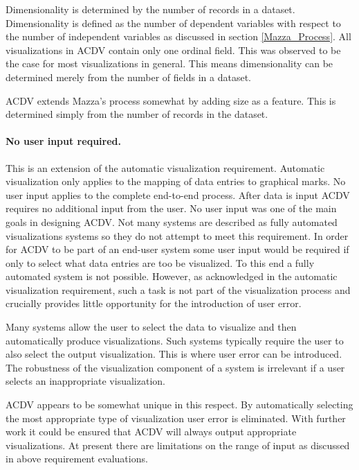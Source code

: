 \documentclass[a4paper, 11pt, titlepage, onehalfspacing]{report}
\begin{document}
Dimensionality is determined by the number of records in a dataset. Dimensionality is defined as the number of dependent variables with respect to the number of independent variables as discussed in section \ref{Mazza_Process}. All visualizations in AC\lightning{}DV contain only one ordinal field. This was observed to be the case for most visualizations in general. This means dimensionality can be determined merely from the number of fields in a dataset.

AC\lightning{}DV extends Mazza's process somewhat by adding size as a feature. This is determined simply from the number of records in the dataset.

\paragraph{No user input required.} This is an extension of the automatic visualization requirement. Automatic visualization only applies to the mapping of data entries to graphical marks. No user input applies to the complete end-to-end process. After data is input AC\lightning{}DV requires no additional input from the user. No user input was one of the main goals in designing AC\lightning{}DV. Not many systems are described as fully automated visualizations systems so they do not attempt to meet this requirement. In order for AC\lightning{}DV to be part of an end-user system some user input would be required if only to select what data entries are too be visualized. To this end a fully automated system is not possible. However, as acknowledged in the automatic visualization requirement, such a task is not part of the visualization process and crucially provides little opportunity for the introduction of user error.

Many systems allow the user to select the data to visualize and then automatically produce visualizations. Such systems typically require the user to also select the output visualization. This is where user error can be introduced. The robustness of the visualization component of a system is irrelevant if a user selects an inappropriate visualization.

AC\lightning{}DV appears to be somewhat unique in this respect. By automatically selecting the most appropriate type of visualization user error is eliminated. With further work it could be ensured that AC\lightning{}DV will always output appropriate visualizations. At present there are limitations on the range of input as discussed in above requirement evaluations. 
\end{document}
